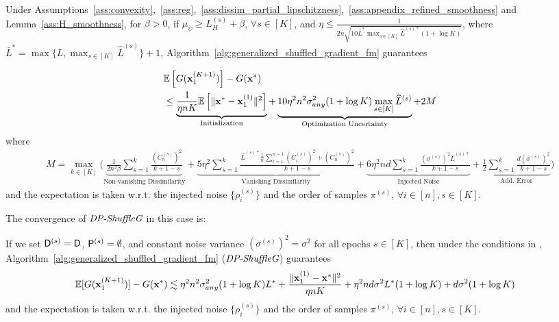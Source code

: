 \begin{theorem}
\label{thm:convergence_proj}
    Under Assumptions~\ref{ass:convexity},~\ref{ass:reg},~\ref{ass:dissim_partial_lipschitzness},~\ref{ass:appendix_refined_smoothness} and Lemma~\ref{ass:H_smoothness}, for $\beta > 0$, 
    if $\mu_{\psi} \geq L_H^{(s)} + \beta$, $\forall s\in [K]$, and 
     $\eta \leq \frac{1}{2n \sqrt{10 \bar{L}^* \max_{s\in [K]}\widehat{L}^{(s)*} (1+\log K)}}$, 
    where $\bar{L}^* = \max\{L, \max_{s\in[K]} \widehat{L}^{(s)}\}+1$,
    Algorithm~\ref{alg:generalized_shuffled_gradient_fm} guarantees

    \begin{align}
        &\mathbb{E}\left[ G({\mathbf{x}}_1^{(K+1)}) \right] - G({\mathbf{x}}^*)\\
        \nonumber
        &\leq \underbrace{ \frac{1}{\eta n K}\mathbb{E}\left[\|{\mathbf{x}}^* - {\mathbf{x}}_1^{(1)}\|^2 \right] 
        }_{\text{Initialization}}
        + \underbrace{ 10 \eta^2 n^2 \sigma_{any}^2 (1+\log K)\max_{s\in[K]} \widehat{L}^{(s)} 
        }_{\text{Optimization Uncertainty}} + 2 M
    \end{align}
    where
    \begin{align*}
        M = \max_{k\in [K]} \Big(
        \underbrace{ \frac{1}{2n^2 \beta}\sum_{s=1}^{k} \frac{ (C_n^{(s)})^2 }{k+1-s}
        }_{\text{Non-vanishing Dissimilarity}}
        + \underbrace{5\eta^2 \sum_{s=1}^{k} \frac{ \widehat{L}^{(s)*} \frac{1}{n}\sum_{i=1}^{n-1}(C_i^{(s)})^2 + (C_n^{(s)})^2 } {k+1-s} }_{\text{Vanishing Dissimilarity}}
        + \underbrace{ 6\eta^2 nd \sum_{s=1}^{k} \frac{ (\sigma^{(s)})^2 \widehat{L}^{(s)*} }{k+1-s} }_{\text{Injected Noise}} 
        + \underbrace{ \frac{1}{2}\sum_{s=1}^{k}\frac{d (\sigma^{(s)})^2}{k+1-s}
        }_{\text{Add. Error}}\Big)
    \end{align*}
    and the expectation is taken w.r.t. the injected noise $\{\rho_i^{(s)}\}$ and the order of samples $\pi^{(s)}$, $\forall i\in [n], s\in [K]$.
\end{theorem}

The convergence of $\textit{DP-ShuffleG}$ in this case is:
\begin{corollary}
\label{corollary:convergence_dpsg_proj}
    If we set 
    ${\mathsf{D}}^{(s)} = {\mathsf{D}}$, ${\mathsf{P}}^{(s)} = \emptyset$, and constant noise variance $(\sigma^{(s)})^2 = \sigma^2$ for all epochs $s\in [K]$,
    then under the conditions in , Algorithm~\ref{alg:generalized_shuffled_gradient_fm} ($\textit{DP-ShuffleG}$) guarantees
    \begin{align*}
        & \mathbb{E} [G({\mathbf{x}}_1^{(K+1)})] - G({\mathbf{x}}^*)
        \lesssim \eta^2 n^2 \sigma_{any}^2 (1+\log K) L^*  + \frac{\|{\mathbf{x}}_1^{(1)} - {\mathbf{x}}^{*}\|^2}{\eta n K} + \eta^2 n d \sigma^2 L^{*} (1 + \log K)
        + d \sigma^2 (1 + \log K)
    \end{align*}
    and the expectation is taken w.r.t. the injected noise $\{\rho_i^{(s)}\}$ and the order of samples $\pi^{(s)}$, $\forall i\in [n], s\in [K]$.
\end{corollary}

